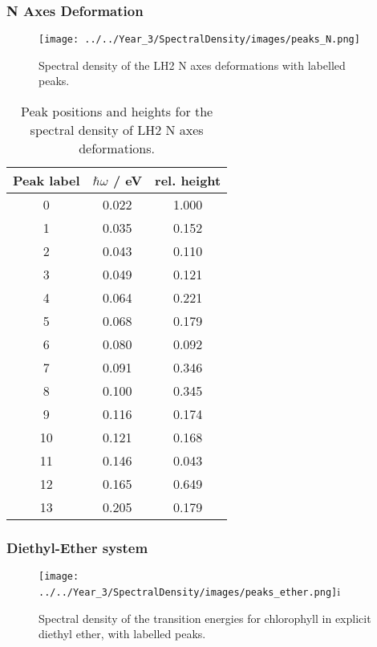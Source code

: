 \afterpartskip
\subsubsection{N Axes Deformation}
\label{subsubsec:specdens_N_axes}

\begin{figure}
    \centering
    \texttt{[image: ../../Year\_3/SpectralDensity/images/peaks\_N.png]}
    \caption{Spectral density of the LH2 N axes deformations with labelled peaks.}
    \label{fig:N_axes_lablled_peaks}
\end{figure}


\begin{table}
    \centering
    \begin{tabular}{||c c c||}
    \hline
    Peak label & $\hbar \omega$ / eV & rel. height \\
    \hline\hline
    
     0 & 0.022 & 1.000 \\
     1 & 0.035 & 0.152 \\
     2 & 0.043 & 0.110 \\
     3 & 0.049 & 0.121 \\
     4 & 0.064 & 0.221 \\
     5 & 0.068 & 0.179 \\
     6 & 0.080 & 0.092 \\
     7 & 0.091 & 0.346 \\
     8 & 0.100 & 0.345 \\
     9 & 0.116 & 0.174 \\
     10 & 0.121 & 0.168 \\
     11 & 0.146 & 0.043 \\
     12 & 0.165 & 0.649 \\
     13 & 0.205 & 0.179 \\
    \hline 
    \end{tabular}
    \caption{Peak positions and heights for the spectral density of LH2 N axes
    deformations.}
    \label{tab:N_axes_lablled_peaks}
\end{table}

\afterpartskip
\subsubsection{Diethyl-Ether system}
\label{subsubsec:specdens_ether}

\begin{figure}
    \centering
    \texttt{[image: ../../Year\_3/SpectralDensity/images/peaks\_ether.png]}i
    \caption{Spectral density of the \Qy transition energies for chlorophyll in 
    explicit diethyl ether, with labelled peaks.}
    \label{fig:ether_lablled_peaks}
\end{figure}

